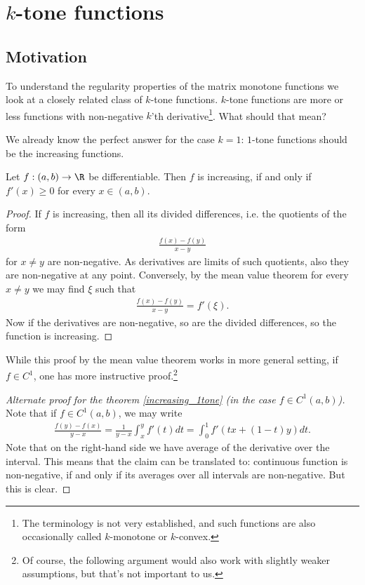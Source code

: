 \chapter{$k$-tone functions}

\section{Motivation}

To understand the regularity properties of the matrix monotone functions we look at a closely related class of $k$-tone functions. $k$-tone functions are more or less functions with non-negative $k$'th derivative\footnote{The terminology is not very established, and such functions are also occasionally called $k$-monotone or $k$-convex.}. What should that mean?

We already know the perfect answer for the case $k = 1$: $1$-tone functions should be the increasing functions.

\begin{lause}\label{increasing_1tone}
	Let $f : (a, b) \to \R$ be differentiable. Then $f$ is increasing, if and only if $f'(x) \geq 0$ for every $x \in (a, b)$.
\end{lause}

\begin{proof}
	If $f$ is increasing, then all its divided differences, i.e. the quotients of the form
	\begin{align*}
		\frac{f(x) - f(y)}{x - y}
	\end{align*}
	for $x \neq y$ are non-negative. As derivatives are limits of such quotients, also they are non-negative at any point. Conversely, by the mean value theorem for every $x \neq y$ we may find $\xi$ such that
	\begin{align*}
		\frac{f(x) - f(y)}{x - y} = f'(\xi).
	\end{align*}
	Now if the derivatives are non-negative, so are the divided differences, so the function is increasing.
\end{proof}

While this proof by the mean value theorem works in more general setting, if $f \in C^{1}$, one has more instructive proof.\footnote{Of course, the following argument would also work with slightly weaker assumptions, but that's not important to us.}

\begin{proof}[Alternate proof for the theorem \ref{increasing_1tone} (in the case $f \in C^{1}(a, b)$)]
	Note that if $f \in C^{1}(a, b)$, we may write
	\begin{align*}
		\frac{f(y) - f(x)}{y - x} = \frac{1}{y - x}\int_{x}^{y} f'(t) dt = \int_{0}^{1} f'(t x + (1 - t) y) dt.
	\end{align*}
	Note that on the right-hand side we have average of the derivative over the interval. This means that the claim can be translated to: continuous function is non-negative, if and only if its averages over all intervals are non-negative. But this is clear.
\end{proof}

